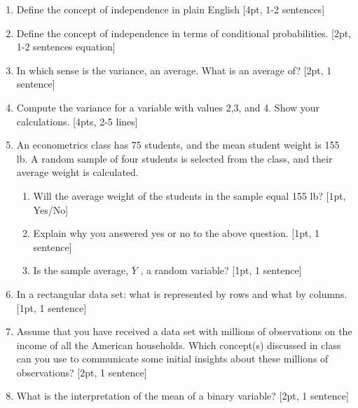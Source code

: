 \documentclass[12pt,notitlepage]{article}
\begin{document}
\begin{enumerate}
\vspace{1cm}


\item Define the concept of independence in plain English [4pt, 1-2 sentences]
    \vspace{3cm}
    \item Define the concept of independence in terms of conditional probabilities. [2pt, 1-2 sentences equation] 
     \vspace{3cm}


\vspace{3cm}

	\item In which sense is the variance, an average. What is an average of? [2pt, 1 sentence]
	
\vspace{3cm}

	\item Compute the variance for a variable with values 2,3, and 4. Show your calculations. [4pts, 2-5 lines] 

	
\vspace{5cm}
\newpage
	\item An econometrics class has 75 students, and the mean student weight is 155 lb. A random sample of four students is selected from the class, and their average weight is calculated. 
	\begin{enumerate}
	    \item Will the average weight of the students in the sample equal 155 lb? [1pt, Yes/No] 
	    \vspace{2cm}
	    \item Explain why you answered yes or no to the above question. [1pt, 1 sentence] 
	    \vspace{2cm}
	    \item Is the sample average, $\overline{Y}$ , a random variable? [1pt, 1 sentence] 
	\end{enumerate}

\vspace{3cm}

	\item In a rectangular data set: what is represented by rows and what by columns.  [1pt, 1 sentence]
	\vspace{3cm}
	\item Assume that you have received a data set with millions of observations on the income of all the American households. Which concept(s) discussed in class can you use to communicate some initial insights about these millions of observations? [2pt, 1 sentence]
	\vspace{3cm}
	\item What is the interpretation of the mean of a binary variable? [2pt, 1 sentence]
	\vspace{3cm}


\end{enumerate}
\end{document}
